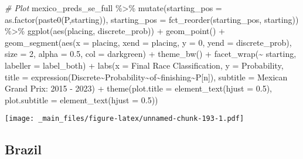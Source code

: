 \documentclass[
]{book}
\newenvironment{Shaded}{\begin{snugshade}}{\end{snugshade}}
\newcommand{\AttributeTok}[1]{\textcolor[rgb]{0.77,0.63,0.00}{#1}}
\newcommand{\CommentTok}[1]{\textcolor[rgb]{0.56,0.35,0.01}{\textit{#1}}}
\newcommand{\DecValTok}[1]{\textcolor[rgb]{0.00,0.00,0.81}{#1}}
\newcommand{\FloatTok}[1]{\textcolor[rgb]{0.00,0.00,0.81}{#1}}
\newcommand{\FunctionTok}[1]{\textcolor[rgb]{0.00,0.00,0.00}{#1}}
\newcommand{\NormalTok}[1]{#1}
\newcommand{\SpecialCharTok}[1]{\textcolor[rgb]{0.00,0.00,0.00}{#1}}
\newcommand{\StringTok}[1]{\textcolor[rgb]{0.31,0.60,0.02}{#1}}
\begin{document}
\begin{Shaded}
\begin{Highlighting}[]
\CommentTok{\# Plot}
\NormalTok{mexico\_preds\_se\_full }\SpecialCharTok{\%\textgreater{}\%}
  \FunctionTok{mutate}\NormalTok{(}\AttributeTok{starting\_pos =} \FunctionTok{as.factor}\NormalTok{(}\FunctionTok{paste0}\NormalTok{(}\StringTok{\textquotesingle{}P\textquotesingle{}}\NormalTok{,starting)),}
         \AttributeTok{starting\_pos =} \FunctionTok{fct\_reorder}\NormalTok{(starting\_pos, starting)) }\SpecialCharTok{\%\textgreater{}\%}
  \FunctionTok{ggplot}\NormalTok{(}\FunctionTok{aes}\NormalTok{(placing, discrete\_prob)) }\SpecialCharTok{+}
  \FunctionTok{geom\_point}\NormalTok{() }\SpecialCharTok{+}
  \FunctionTok{geom\_segment}\NormalTok{(}\FunctionTok{aes}\NormalTok{(}\AttributeTok{x =}\NormalTok{ placing, }\AttributeTok{xend =}\NormalTok{ placing, }\AttributeTok{y =} \DecValTok{0}\NormalTok{, }\AttributeTok{yend =}\NormalTok{ discrete\_prob),}
               \AttributeTok{size =} \DecValTok{2}\NormalTok{, }\AttributeTok{alpha =} \FloatTok{0.5}\NormalTok{, }\AttributeTok{col =} \StringTok{\textquotesingle{}darkgreen\textquotesingle{}}\NormalTok{) }\SpecialCharTok{+}
  \FunctionTok{theme\_bw}\NormalTok{() }\SpecialCharTok{+}
  \FunctionTok{facet\_wrap}\NormalTok{(}\SpecialCharTok{\textasciitilde{}}\NormalTok{ starting, }\AttributeTok{labeller =}\NormalTok{ label\_both) }\SpecialCharTok{+}
  \FunctionTok{labs}\NormalTok{(}\AttributeTok{x =} \StringTok{\textquotesingle{}Final Race Classification\textquotesingle{}}\NormalTok{,}
       \AttributeTok{y =} \StringTok{\textquotesingle{}Probability\textquotesingle{}}\NormalTok{,}
       \AttributeTok{title =} \FunctionTok{expression}\NormalTok{(Discrete}\SpecialCharTok{\textasciitilde{}}\NormalTok{Probability}\SpecialCharTok{\textasciitilde{}}\NormalTok{of}\SpecialCharTok{\textasciitilde{}}\NormalTok{finishing}\SpecialCharTok{\textasciitilde{}}\NormalTok{P[n]),}
       \AttributeTok{subtitle =} \StringTok{\textquotesingle{}Mexican Grand Prix: 2015 {-} 2023\textquotesingle{}}\NormalTok{) }\SpecialCharTok{+}
  \FunctionTok{theme}\NormalTok{(}\AttributeTok{plot.title =} \FunctionTok{element\_text}\NormalTok{(}\AttributeTok{hjust =} \FloatTok{0.5}\NormalTok{),}
        \AttributeTok{plot.subtitle =} \FunctionTok{element\_text}\NormalTok{(}\AttributeTok{hjust =} \FloatTok{0.5}\NormalTok{)) }
\end{Highlighting}
\end{Shaded}

\texttt{[image: \_main\_files/figure-latex/unnamed-chunk-193-1.pdf]}

\hypertarget{brazil-1}{%
\subsection{Brazil}\label{brazil-1}}
\end{document}

